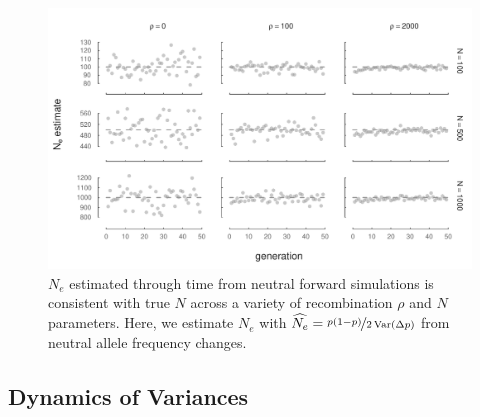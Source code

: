\documentclass[11pt]{article}
\DeclareMathOperator{\var}{Var}
\begin{document}
\begin{figure}[!ht] \centering
  \includegraphics{./images/supp-Ne-est-neutral.pdf} 
  
  \caption{$N_e$ estimated through time from neutral forward simulations is
  consistent with true $N$ across a variety of recombination $\rho$ and $N$
parameters. Here, we estimate $N_e$ with $\widehat{N_e} = \nicefrac{p(1-p)}{2
\var(\Delta p)}$ from neutral allele frequency changes.}

  \label{fig:ne-neut}
\end{figure}

\clearpage
\newpage

\subsection{Dynamics of Variances}
\end{document}
